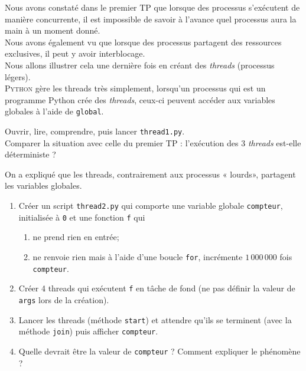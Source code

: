 \documentclass[a4paper,12pt,french]{book}
\begin{document}

Nous avons constaté dans le premier TP que lorsque des processus s'exécutent de manière concurrente, il est impossible de savoir à l'avance quel processus aura la main à un moment donné.\\

Nous avons également vu que lorsque des processus partagent des ressources exclusives, il peut y avoir interblocage.\\

Nous allons illustrer cela une dernière fois en créant des \textit{threads} (processus légers). \\

\textsc{Python} gère les threads très simplement, lorsqu'un processus qui est un programme Python crée des \textit{threads}, ceux-ci peuvent accéder aux variables globales à l'aide de \texttt{global}.

\begin{exercice}[]
Ouvrir, lire, comprendre, puis lancer \texttt{thread1.py}.\\
Comparer la situation avec celle du premier TP : l'exécution des 3 \textit{threads} est-elle déterministe ?
\end{exercice}

\begin{exercice}
On a expliqué que les threads, contrairement aux processus « lourds», partagent les variables globales.
\begin{enumerate}
	\item 	Créer un script \texttt{thread2.py} qui comporte une variable globale \texttt{compteur}, initialisée à \texttt{0} et une fonction \texttt{f} qui
            \begin{enumerate}[--]
            	\item 	ne prend rien en entrée;
            	\item 	ne renvoie rien mais à l'aide d'une boucle \texttt{for}, incrémente $1\,000\,000$ fois \texttt{compteur}.
            \end{enumerate}
	\item 	Créer 4 threads qui exécutent \texttt{f} en tâche de fond (ne pas définir la valeur de \texttt{args} lors de la création).
    \item 	Lancer les threads (méthode \texttt{start}) et attendre qu'ils se terminent (avec la méthode \texttt{join}) puis afficher \texttt{compteur}.
    \item 	Quelle devrait être la valeur de \texttt{compteur} ? Comment expliquer le phénomène ?
\end{enumerate}
\end{exercice}
\end{document}
